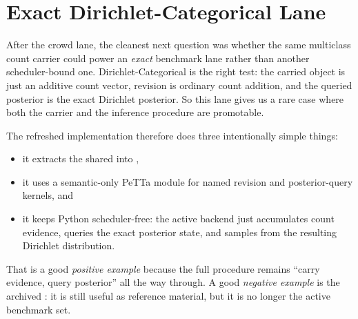 \documentclass[11pt,openany]{report}
\begin{document}
\section{Exact Dirichlet-Categorical Lane}
\label{app:pplbench-dirichlet-categorical}

After the crowd lane, the cleanest next question was whether the same
multiclass count carrier could power an \emph{exact} benchmark lane rather
than another scheduler-bound one.  Dirichlet-Categorical is the right test:
the carried object is just an additive count vector, revision is ordinary
count addition, and the queried posterior is the exact Dirichlet posterior.
So this lane gives us a rare case where both the carrier and the inference
procedure are promotable.

The refreshed implementation therefore does three intentionally simple things:
\begin{itemize}
\item it extracts the shared  into
,
\item it uses a semantic-only PeTTa module
for named revision and posterior-query kernels, and
\item it keeps Python scheduler-free: the active backend
 just accumulates count
evidence, queries the exact posterior state, and samples from the resulting
Dirichlet distribution.
\end{itemize}

That is a good \emph{positive example} because the full procedure remains
``carry evidence, query posterior'' all the way through.  A good
\emph{negative example} is the archived
: it is still
useful as reference material, but it is no longer the active benchmark
set.
\end{document}
